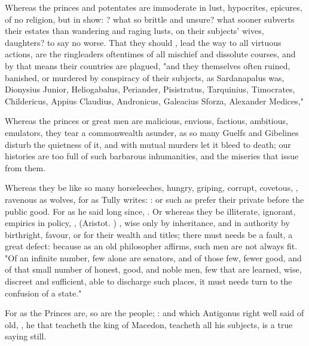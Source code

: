 Whereas the princes and potentates are immoderate in lust, hypocrites,
epicures, of no religion, but in show: ? what so
brittle and unsure? what sooner subverts their estates than wandering and
raging lusts, on their subjects' wives, daughters? to say no worse. That they
should , lead the way to all virtuous actions, are the
ringleaders oftentimes of all mischief and dissolute courses, and by that means
their countries are plagued, "and they themselves often
ruined, banished, or murdered by conspiracy of their subjects, as Sardanapalus
was, Dionysius Junior, Heliogabalus, Periander, Pisistratus, Tarquinius,
Timocrates, Childericus, Appius Claudius, Andronicus, Galeacius Sforza,
Alexander Medices," \etc{}

Whereas the princes or great men are malicious, envious, factious, ambitious,
emulators, they tear a commonwealth asunder, as so many Guelfs and Gibelines
disturb the quietness of it, and with mutual murders let it
bleed to death; our histories are too full of such barbarous inhumanities, and
the miseries that issue from them.

Whereas they be like so many horseleeches, hungry, griping, corrupt,
covetous, , ravenous as wolves, for
as Tully writes: : or such as prefer their private before the public good.
For as he said long since, . Or whereas they be illiterate, ignorant, empirics in policy, ,  (Aristot.
) , wise only by
inheritance, and in authority by birthright, favour, or for their wealth and
titles; there must needs be a fault, a great defect:
because as an old philosopher affirms, such men are not
always fit. "Of an infinite number, few alone are senators, and of those few,
fewer good, and of that small number of honest, good, and noble men, few that
are learned, wise, discreet and sufficient, able to discharge such places, it
must needs turn to the confusion of a state."

For as the Princes are, so are the people; : and which Antigonus right well said of old,
, he that teacheth
the king of Macedon, teacheth all his subjects, is a true saying still.

